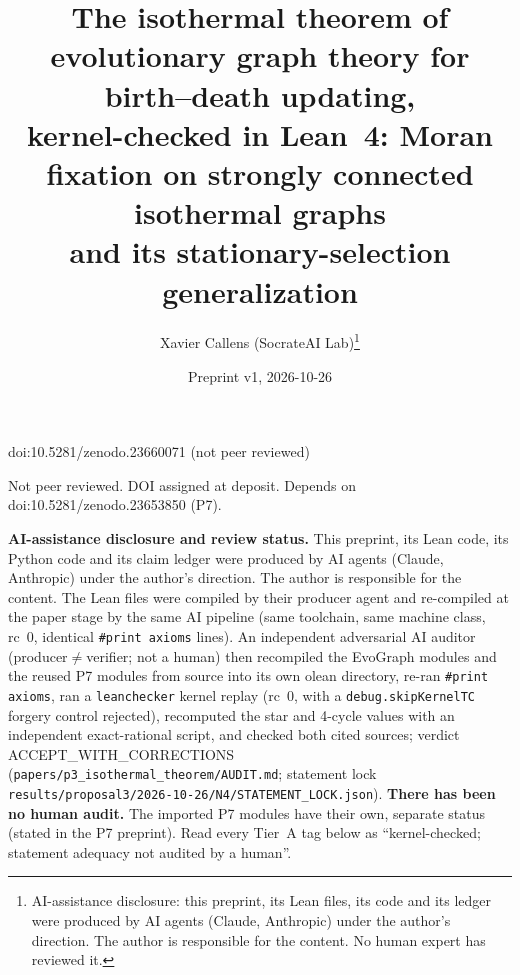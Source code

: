 \documentclass[11pt]{article}
\title{The isothermal theorem of evolutionary graph theory for birth--death updating,\\
kernel-checked in Lean~4: Moran fixation on strongly connected isothermal graphs\\
and its stationary-selection generalization}
\author{Xavier Callens (SocrateAI Lab)\thanks{AI-assistance disclosure: this preprint, its Lean files, its code and its ledger were produced by AI agents (Claude, Anthropic) under the author's direction. The author is responsible for the content. No human expert has reviewed it.}}
\date{Preprint v1, 2026-10-26}
\begin{document}
\maketitle
\begin{center}\small doi:10.5281/zenodo.23660071 \quad (not peer reviewed)\end{center}

\begin{center}\small Not peer reviewed. DOI assigned at deposit. Depends on doi:10.5281/zenodo.23653850 (P7).\end{center}

\noindent\textbf{AI-assistance disclosure and review status.} This preprint, its Lean code, its Python code and its claim ledger were
produced by AI agents (Claude, Anthropic) under the author's direction. The author is responsible for the content. The Lean files
were compiled by their producer agent and re-compiled at the paper stage by the same AI pipeline (same toolchain, same machine class, rc~0,
identical \texttt{\#print axioms} lines). An independent adversarial AI auditor (producer${}\neq{}$verifier; not a human) then recompiled the EvoGraph modules and the reused P7 modules from source into its own olean directory,
re-ran \texttt{\#print axioms}, ran a \texttt{leanchecker} kernel replay (rc~0, with a \texttt{debug.skipKernelTC} forgery control rejected), recomputed the star and 4-cycle values with an independent exact-rational script, and checked both cited sources;
verdict ACCEPT\_WITH\_CORRECTIONS (\texttt{papers/p3\_isothermal\_theorem/AUDIT.md}; statement lock \texttt{results/proposal3/2026-10-26/N4/STATEMENT\_LOCK.json}). \textbf{There has been no human audit.}
The imported P7 modules have their own, separate status
(stated in the P7 preprint). Read every Tier~A tag below as ``kernel-checked; statement adequacy not audited by a human''.
\end{document}

